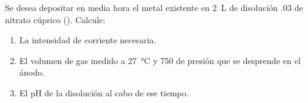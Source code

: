 Se desea depositar en media hora el metal existente en \SI{2}{\liter} de disolución \SI{,03}{\Molar} de nitrato cúprico (). Calcule:
\begin{enumerate}[label={\alph*)},font={\color{red!50!black}\bfseries}]
   \item La intensidad de corriente necesaria.
   \item El volumen de gas medido a \SI{27}{\celsius} y \SI{750}{\torr} de presión que se desprende en el ánodo.
   \item El pH de la disolución al cabo de ese tiempo.
\end{enumerate}
